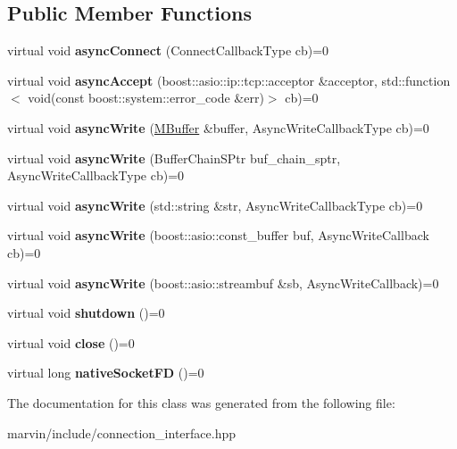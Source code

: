 \subsection*{Public Member Functions}
\begin{DoxyCompactItemize}
\item 
\mbox{\label{class_connection_interface_a6741f1ae1b638b9bc651aafb8e0f2d3e}} 
virtual void {\bfseries async\+Connect} (Connect\+Callback\+Type cb)=0
\item 
\mbox{\label{class_connection_interface_a646b195a8ca848fcc97186b48453964e}} 
virtual void {\bfseries async\+Accept} (boost\+::asio\+::ip\+::tcp\+::acceptor \&acceptor, std\+::function$<$ void(const boost\+::system\+::error\+\_\+code \&err)$>$ cb)=0
\item 
\mbox{\label{class_connection_interface_a256d0020c9bddb14c5832ff1c6278ad2}} 
virtual void {\bfseries async\+Write} (\hyperlink{struct_m_buffer}{M\+Buffer} \&buffer, Async\+Write\+Callback\+Type cb)=0
\item 
\mbox{\label{class_connection_interface_a21ea35f069518ee6489a67c27ecad1f0}} 
virtual void {\bfseries async\+Write} (Buffer\+Chain\+S\+Ptr buf\+\_\+chain\+\_\+sptr, Async\+Write\+Callback\+Type cb)=0
\item 
\mbox{\label{class_connection_interface_aa8523c8458edaacc38f3e55f657f8298}} 
virtual void {\bfseries async\+Write} (std\+::string \&str, Async\+Write\+Callback\+Type cb)=0
\item 
\mbox{\label{class_connection_interface_a6bcdb433cfa5d6c4040d15dd64e6014b}} 
virtual void {\bfseries async\+Write} (boost\+::asio\+::const\+\_\+buffer buf, Async\+Write\+Callback cb)=0
\item 
\mbox{\label{class_connection_interface_a505ca3b8a542e8014b76e0a3131372ec}} 
virtual void {\bfseries async\+Write} (boost\+::asio\+::streambuf \&sb, Async\+Write\+Callback)=0
\item 
\mbox{\label{class_connection_interface_a0a36ca4e4133eabbef1daeccb1f28f6c}} 
virtual void {\bfseries shutdown} ()=0
\item 
\mbox{\label{class_connection_interface_ab911b5babbc2321520114b302fce8df6}} 
virtual void {\bfseries close} ()=0
\item 
\mbox{\label{class_connection_interface_a5ecc247e28761248e4c5266dd871c7b6}} 
virtual long {\bfseries native\+Socket\+FD} ()=0
\end{DoxyCompactItemize}


The documentation for this class was generated from the following file\+:\begin{DoxyCompactItemize}
\item 
marvin/include/connection\+\_\+interface.\+hpp\end{DoxyCompactItemize}
